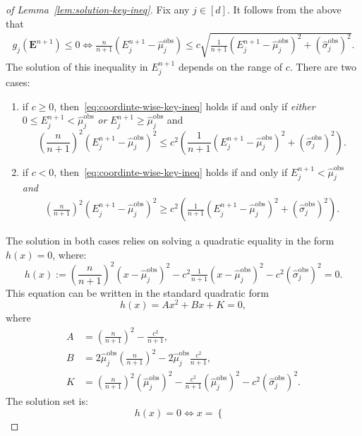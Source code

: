 \begin{proof}[of Lemma~\ref{lem:solution-key-ineq}]
Fix any $j\in [d]$. It follows from the above that
\begin{align}
    g_j(\mathbf{E}^{n+1}) \leq 0 \iff \frac{n}{n+1}\left(E^{n+1}_j-\hat{\mu}^\mathrm{obs}_j\right) \leq c\sqrt{\frac{1}{n+1}\left(E^{n+1}_j-\hat{\mu}^\mathrm{obs}_j\right)^2+(\hat{\sigma}^\mathrm{obs}_j)^2}.
    \label{eq:coordinte-wise-key-ineq}
\end{align}
The solution of this inequality in $E^{n+1}_j$ depends on the range of $c$. There are two cases:
\begin{enumerate}
\item if $c \geq 0$, then~\eqref{eq:coordinte-wise-key-ineq} holds if and only if \emph{either} $0\leq E^{n+1}_j < \hat{\mu}^\mathrm{obs}_j$ \emph{or} $E^{n+1}_j \geq \hat{\mu}^\mathrm{obs}_j$ and
    \[
    \left(\frac{n}{n+1}\right)^2\left(E^{n+1}_j-\hat{\mu}^\mathrm{obs}_j\right)^2 \leq c^2\left(\frac{1}{n+1}(E^{n+1}_j-\hat{\mu}^\mathrm{obs}_j)^2 + (\hat{\sigma}^\mathrm{obs}_j)^2\right).
    \]
\item if $c < 0$, then~\eqref{eq:coordinte-wise-key-ineq} holds if and only if $E^{n+1}_j <  \hat{\mu}^\mathrm{obs}_j$ \emph{and}
    \begin{align*}
        \left(\frac{n}{n+1}\right)^2\left(E^{n+1}_j-\hat{\mu}^\mathrm{obs}_j\right)^2 \geq c^2\left(\tfrac{1}{n+1}\left(E^{n+1}_j-\hat{\mu}^\mathrm{obs}_j\right)^2 + (\hat{\sigma}^\mathrm{obs}_j)^2\right).
    \end{align*}
  \end{enumerate}
  The solution in both cases relies on solving a quadratic equality in the form $h(x) = 0$, where:
\[
h(x):=\left(\frac{n}{n+1}\right)^2\left(x-\hat{\mu}^\mathrm{obs}_j\right)^2 - c^2\tfrac{1}{n+1}\left(x-\hat{\mu}^\mathrm{obs}_j\right)^2 - c^2(\hat{\sigma}^\mathrm{obs}_j)^2 = 0.
\]
This equation can be written in the standard quadratic form 
\[
h(x)= Ax^2+Bx +K = 0,
\]
where
\begin{align*}
 A & = \left(\frac{n}{n+1}\right)^2 - \frac{c^2}{n+1}, \\
 B & = 2\hat{\mu}^\mathrm{obs}_j\left(\frac{n}{n+1}\right)^2-2\hat{\mu}^\mathrm{obs}_j \frac{c^2}{n+1}, \\
 K & = \left(\frac{n}{n+1}\right)^2(\hat{\mu}^\mathrm{obs}_j)^2-\frac{c^2}{n+1}(\hat{\mu}^\mathrm{obs}_j)^2-c^2(\hat{\sigma}^\mathrm{obs}_j)^2.
\end{align*}
The solution set is:
\[h(x) = 0 \iff x=
\begin{cases}

\end{cases}\]
\end{proof}
